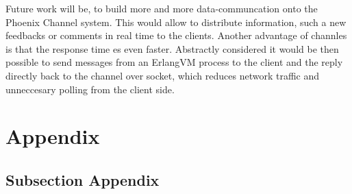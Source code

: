 \textcolor{newcode}{Future work will be, to build more and more data-communcation onto the Phoenix Channel system. This would allow to distribute information, such a new feedbacks or comments in real time to the clients. Another advantage of channles is that the response time es even faster. Abstractly considered it would be then possible to send messages from an ErlangVM process to the client and the reply directly back to the channel over socket, which reduces network traffic and unneccesary polling from the client side.}


\cleardoublepage
\appendixheader

\setcounter{section}{0}
\setcounter{chapter}{0}
\renewcommand{\thesection}{A.\arabic{section}}
\renewcommand{\thechapter}{A}



\chapter*{Appendix}  %
\setcounter{section}{0}
\setcounter{chapter}{0}
\renewcommand{\thesection}{A.\arabic{section}}
\renewcommand{\thechapter}{A}  


\section{Subsection Appendix}

\cleardoublepage
\nocite{*}



